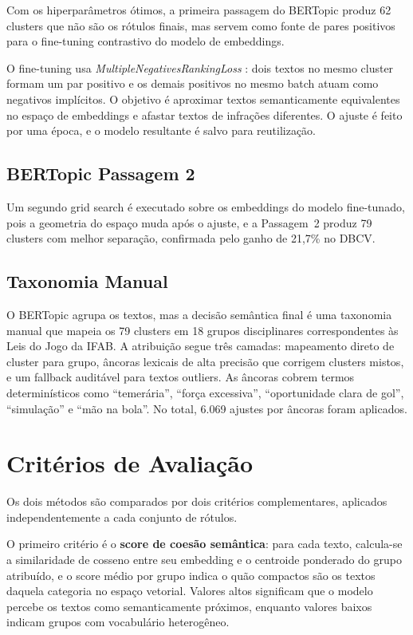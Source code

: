 \documentclass[
12pt,
openany,
oneside,
a4paper,
chapter=TITLE,
english,
french,
spanish,
brazil
]{USPSC-classe/USPSC}
\begin{document}
Com os hiperparâmetros ótimos, a primeira passagem do BERTopic produz 62 clusters que não são os rótulos finais, mas servem como fonte de pares positivos para o fine-tuning contrastivo do modelo de embeddings.

O fine-tuning usa \textit{MultipleNegativesRankingLoss} \cite{karpukhin2020dpr,gao2021simcse}: dois textos no mesmo cluster formam um par positivo e os demais positivos no mesmo batch atuam como negativos implícitos. O objetivo é aproximar textos semanticamente equivalentes no espaço de embeddings e afastar textos de infrações diferentes. O ajuste é feito por uma época, e o modelo resultante é salvo para reutilização.

\subsection{BERTopic Passagem 2}

Um segundo grid search é executado sobre os embeddings do modelo fine-tunado, pois a geometria do espaço muda após o ajuste, e a Passagem~2 produz 79 clusters com melhor separação, confirmada pelo ganho de 21,7\% no DBCV.

\subsection{Taxonomia Manual}

O BERTopic agrupa os textos, mas a decisão semântica final é uma taxonomia manual que mapeia os 79 clusters em 18 grupos disciplinares correspondentes às Leis do Jogo da IFAB. A atribuição segue três camadas: mapeamento direto de cluster para grupo, âncoras lexicais de alta precisão que corrigem clusters mistos, e um fallback auditável para textos outliers. As âncoras cobrem termos determinísticos como ``temerária'', ``força excessiva'', ``oportunidade clara de gol'', ``simulação'' e ``mão na bola''. No total, 6.069 ajustes por âncoras foram aplicados.


\section{Critérios de Avaliação}

Os dois métodos são comparados por dois critérios complementares, aplicados independentemente a cada conjunto de rótulos.

O primeiro critério é o \textbf{score de coesão semântica}: para cada texto, calcula-se a similaridade de cosseno entre seu embedding e o centroide ponderado do grupo atribuído, e o score médio por grupo indica o quão compactos são os textos daquela categoria no espaço vetorial. Valores altos significam que o modelo percebe os textos como semanticamente próximos, enquanto valores baixos indicam grupos com vocabulário heterogêneo.
\end{document}

